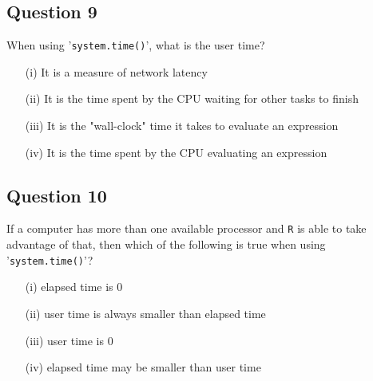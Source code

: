 \documentclass[11pt]{article} %
\begin{document}
\subsection*{Question 9}
When using '\texttt{system.time()}', what is the user time?

\begin{itemize}
\item[(i)] It is a measure of network latency
\item[(ii)] It is the time spent by the CPU waiting for other tasks to finish
\item[(iii)] It is the "wall-clock" time it takes to evaluate an expression
\item[(iv)] It is the time spent by the CPU evaluating an expression
\end{itemize}
\subsection*{Question 10}
If a computer has more than one available processor and \texttt{R} is able to take advantage of that, then which of the following is true when using '\texttt{system.time()}'?
\begin{itemize}
\item[(i)] elapsed time is 0
\item[(ii)] user time is always smaller than elapsed time
\item[(iii)] user time is 0
\item[(iv)] elapsed time may be smaller than user time
\end{itemize}
\end{document}
